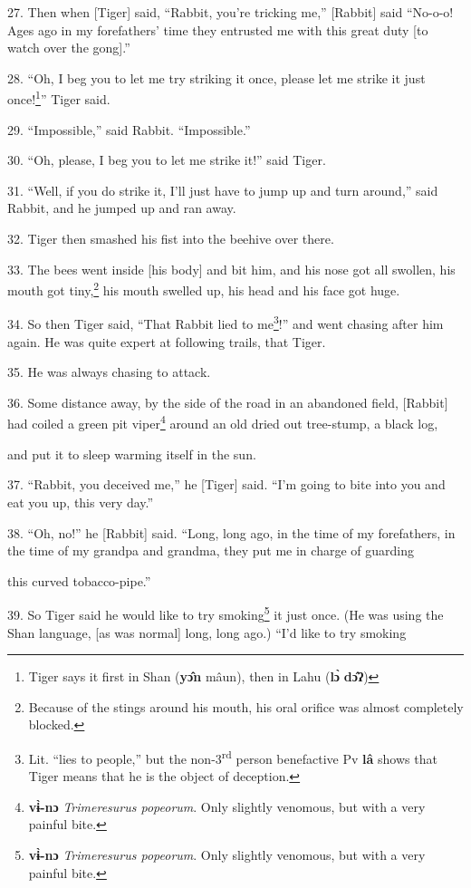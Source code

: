 27. Then when [Tiger] said, ``Rabbit, you're tricking me,'' [Rabbit] said ``No-o-o!
Ages ago in my forefathers' time they entrusted me with this great duty [to watch
over the gong].''

28. ``Oh, I beg you to let me try striking it once, please let me strike it just
once!\footnote{Tiger says it first in Shan (\textbf{yɔ̂n} mâun), then in Lahu (\textbf{lɔ̀} \textbf{dɔ̂ʔ})}'' Tiger said.

29. ``Impossible,'' said Rabbit. ``Impossible.''

30. ``Oh, please, I beg you to let me strike it!'' said Tiger.

31. ``Well, if you do strike it, I'll just have to jump up and turn around,'' said
Rabbit, and he jumped up and ran away.

32. Tiger then smashed his fist into the beehive over there.

33. The bees went inside [his body] and bit him, and his nose got all swollen,
his mouth got tiny,\footnote{Because of the stings around his mouth, his oral orifice was almost completely blocked.} his mouth swelled up, his head and his face got huge.

34. So then Tiger said, ``That Rabbit lied to me\footnote{Lit. ``lies to people,'' but the non-3\textsuperscript{rd} person benefactive Pv \textbf{lâ} shows that Tiger means that he is the object of deception.}!'' and went chasing after
him again. He was quite expert at following trails, that Tiger.

35. He was always chasing to attack.

36. Some distance away, by the side of the road in an abandoned field, [Rabbit]
had coiled a green pit viper\footnote{\textbf{vɨ̀-nɔ} \textit{Trimeresurus popeorum}. Only slightly venomous, but with a very painful bite.} around an old dried out tree-stump, a black log,


and put it to sleep warming itself in the sun.

37. ``Rabbit, you deceived me,'' he [Tiger] said. ``I'm going to bite into you
and eat you up, this very day.''

38. ``Oh, no!'' he [Rabbit] said. ``Long, long ago, in the time of my forefathers,
in the time of my grandpa and grandma, they put me in charge of guarding

this curved tobacco-pipe.''

39. So Tiger said he would like to try smoking\footnote{\textbf{vɨ̀-nɔ} \textit{Trimeresurus popeorum}. Only slightly venomous, but with a very painful bite.} it just once. (He was using
the Shan language, [as was normal] long, long ago.) ``I'd like to try smoking


